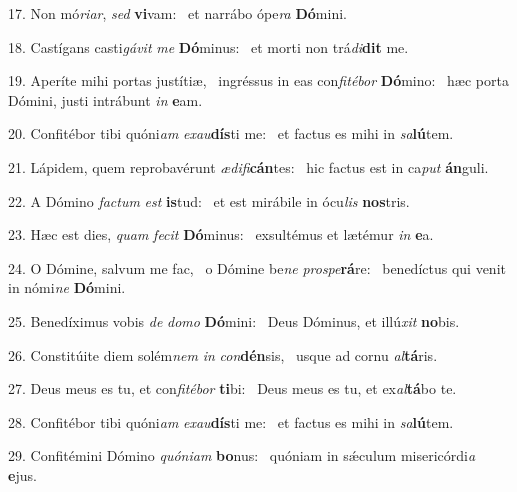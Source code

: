 17. Non mó\textit{ri}\textit{ar}, \textit{sed} \textbf{vi}vam: \ast\  et narrábo ópe\textit{ra} \textbf{Dó}mini.\

18. Castígans casti\textit{gá}\textit{vit} \textit{me} \textbf{Dó}minus: \ast\  et morti non trá\textit{di}\textbf{dit} me.\

19. Aperíte mihi portas justítiæ, \dag\  ingréssus in eas con\textit{fi}\textit{té}\textit{bor} \textbf{Dó}mino: \ast\  hæc porta Dómini, justi intrábunt \textit{in} \textbf{e}am.\

20. Confitébor tibi quóni\textit{am} \textit{ex}\textit{au}\textbf{dís}ti me: \ast\  et factus es mihi in \textit{sa}\textbf{lú}tem.\

21. Lápidem, quem reprobavérunt \textit{æ}\textit{di}\textit{fi}\textbf{cán}tes: \ast\  hic factus est in ca\textit{put} \textbf{án}guli.\

22. A Dómino \textit{fac}\textit{tum} \textit{est} \textbf{is}tud: \ast\  et est mirábile in ócu\textit{lis} \textbf{nos}tris.\

23. Hæc est dies, \textit{quam} \textit{fe}\textit{cit} \textbf{Dó}minus: \ast\  exsultémus et lætémur \textit{in} \textbf{e}a.\

24. O Dómine, salvum me fac, \dag\  o Dómine be\textit{ne} \textit{pro}\textit{spe}\textbf{rá}re: \ast\  benedíctus qui venit in nómi\textit{ne} \textbf{Dó}mini.\

25. Benedíximus vobis \textit{de} \textit{do}\textit{mo} \textbf{Dó}mini: \ast\  Deus Dóminus, et illú\textit{xit} \textbf{no}bis.\

26. Constitúite diem solém\textit{nem} \textit{in} \textit{con}\textbf{dén}sis, \ast\  usque ad cornu \textit{al}\textbf{tá}ris.\

27. Deus meus es tu, et con\textit{fi}\textit{té}\textit{bor} \textbf{ti}bi: \ast\  Deus meus es tu, et ex\textit{al}\textbf{tá}bo te.\

28. Confitébor tibi quóni\textit{am} \textit{ex}\textit{au}\textbf{dís}ti me: \ast\  et factus es mihi in \textit{sa}\textbf{lú}tem.\

29. Confitémini Dómino \textit{quón}\textit{i}\textit{am} \textbf{bo}nus: \ast\  quóniam in sǽculum misericórdi\textit{a} \textbf{e}jus.\

